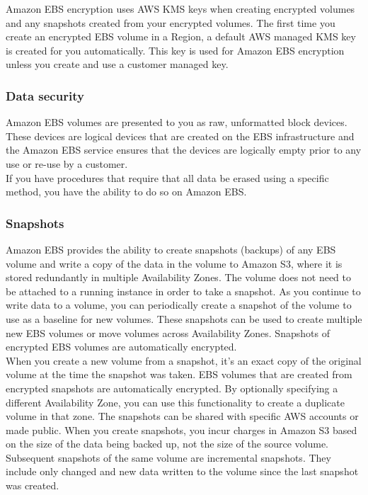 \documentclass[12pt, letterpaper, twoside]{article}
\begin{document}
Amazon EBS encryption uses AWS KMS keys when creating encrypted volumes and any snapshots created from your encrypted volumes. The first 
time you create an encrypted EBS volume in a Region, a default AWS managed KMS key is created for you automatically. This key is used for 
Amazon EBS encryption unless you create and use a customer managed key.\\

\subsubsection{Data security}
Amazon EBS volumes are presented to you as raw, unformatted block devices. These devices are logical devices that are created on the EBS 
infrastructure and the Amazon EBS service ensures that the devices are logically empty prior to any use or re-use by a customer.\\
If you have procedures that require that all data be erased using a specific method, you have the ability to do so on Amazon EBS.\\

\subsubsection{Snapshots}
Amazon EBS provides the ability to create snapshots (backups) of any EBS volume and write a copy of the data in the volume to Amazon S3, 
where it is stored redundantly in multiple Availability Zones. The volume does not need to be attached to a running instance in order to take
a snapshot. As you continue to write data to a volume, you can periodically create a snapshot of the volume to use as a baseline for new 
volumes. These snapshots can be used to create multiple new EBS volumes or move volumes across Availability Zones. Snapshots of encrypted 
EBS volumes are automatically encrypted.\\

When you create a new volume from a snapshot, it's an exact copy of the original volume at the time the snapshot was taken. EBS volumes that 
are created from encrypted snapshots are automatically encrypted. By optionally specifying a different Availability Zone, you can use this 
functionality to create a duplicate volume in that zone. The snapshots can be shared with specific AWS accounts or made public. When you 
create snapshots, you incur charges in Amazon S3 based on the size of the data being backed up, not the size of the source volume. Subsequent 
snapshots of the same volume are incremental snapshots. They include only changed and new data written to the volume since the last snapshot 
was created.\\
\end{document}

